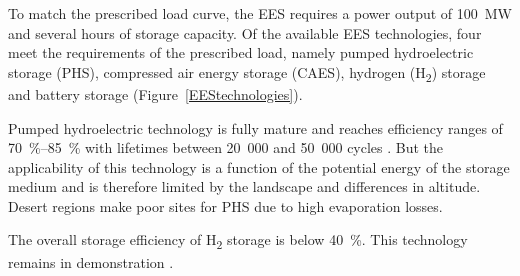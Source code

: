 To match the prescribed load curve, the EES requires a power output of \SI{100}{\mega\watt} and several hours of storage capacity. Of the available EES technologies, four meet the requirements of the prescribed load, namely pumped hydroelectric storage (PHS), compressed air energy storage (CAES), hydrogen (H\textsubscript{2}) storage and battery storage (Figure~\ref{EEStechnologies}).


Pumped hydroelectric technology is fully mature and reaches efficiency ranges of \SIrange{70}{85}{\percent} with lifetimes between 20~000 and 50~000 cycles \cite{IEA2014c}. But the applicability of this technology is a function of the potential energy of the storage medium and is therefore limited by the landscape and differences in altitude. Desert regions make poor sites for PHS due to high evaporation losses.

The overall storage efficiency of H\textsubscript{2} storage is below \SI{40}{\percent}. This technology remains in demonstration \cite{IEA2014c,IEA2015}.

